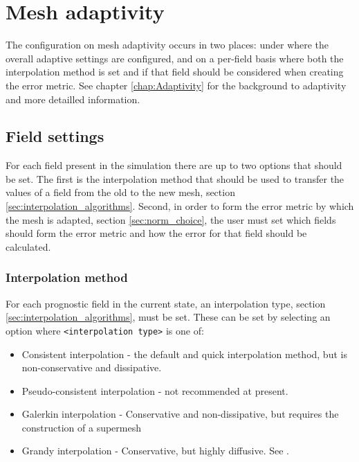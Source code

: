 \section{Mesh adaptivity} \label{sec:config_adapt}

The configuration on mesh adaptivity occurs in two places: under  where 
the overall adaptive settings are configured, and on a per-field basis where both the interpolation
method is set and if that field should be considered when creating the error metric. See chapter 
\ref{chap:Adaptivity} for the background to adaptivity and more detailled information.

\subsection{Field settings}

For each field present in the simulation there are up to two options that should be set. The first
is the interpolation method that should be used to transfer the values of a field from the old to the new mesh, section \ref{sec:interpolation_algorithms}.
Second, in order to form the error metric by which the mesh is adapted, section \ref{sec:norm_choice}, the user must set which fields
should form the error metric and how the error for that field should be calculated.

\subsubsection{Interpolation method} \label{sec:config_adapt_interp}

For each prognostic field in the current state, an interpolation type, section \ref{sec:interpolation_algorithms}, must be set. These can be set by selecting an
option  where \texttt{<interpolation type>} is one of:
\begin{itemize}
\item Consistent interpolation - the default and quick interpolation method, but is non-conservative and dissipative.
\item Pseudo-consistent interpolation - not recommended at present.
\item Galerkin interpolation - Conservative and non-dissipative, but requires the construction of a supermesh \citep{farrell2009a,farrell2010a}
\item Grandy interpolation - Conservative, but highly diffusive. See \citet{grandy1999}.
\end{itemize}

